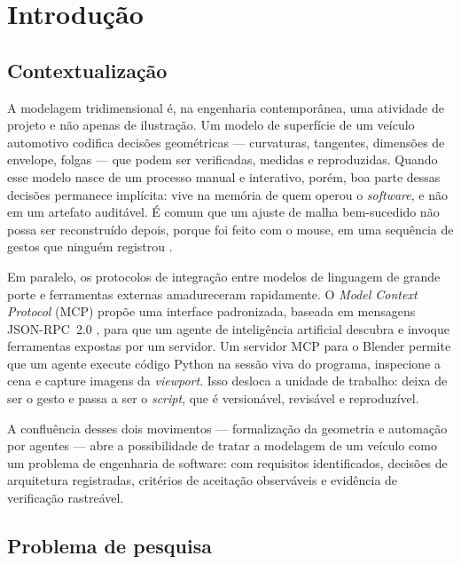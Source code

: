 \chapter{Introdu\c{c}\~ao}

\section{Contextualiza\c{c}\~ao}

A modelagem tridimensional \'e, na engenharia contempor\^anea, uma atividade de projeto e n\~ao
apenas de ilustra\c{c}\~ao. Um modelo de superf\'icie de um ve\'iculo automotivo codifica
decis\~oes geom\'etricas --- curvaturas, tangentes, dimens\~oes de envelope, folgas --- que podem
ser verificadas, medidas e reproduzidas. Quando esse modelo nasce de um processo manual e
interativo, por\'em, boa parte dessas decis\~oes permanece impl\'icita: vive na mem\'oria de
quem operou o \emph{software}, e n\~ao em um artefato audit\'avel. \'E comum que um ajuste de
malha bem-sucedido n\~ao possa ser reconstru\'ido depois, porque foi feito com o mouse, em uma
sequ\^encia de gestos que ningu\'em registrou \cite{bbotsch2010}.

Em paralelo, os protocolos de integra\c{c}\~ao entre modelos de linguagem de grande porte e
ferramentas externas amadureceram rapidamente. O \emph{Model Context Protocol} (MCP)
\cite{mcpspec2024} prop\~oe uma interface padronizada, baseada em mensagens JSON-RPC~2.0
\cite{jsonrpc2020}, para que um agente de intelig\^encia artificial descubra e invoque
ferramentas expostas por um servidor. Um servidor MCP para o Blender permite que um agente
execute c\'odigo Python na sess\~ao viva do programa, inspecione a cena e capture imagens da
\emph{viewport}. Isso desloca a unidade de trabalho: deixa de ser o gesto e passa a ser o
\emph{script}, que \'e version\'avel, revis\'avel e reproduz\'ivel.

A conflu\^encia desses dois movimentos --- formaliza\c{c}\~ao da geometria e automa\c{c}\~ao por
agentes --- abre a possibilidade de tratar a modelagem de um ve\'iculo como um problema de
engenharia de software: com requisitos identificados, decis\~oes de arquitetura registradas,
crit\'erios de aceita\c{c}\~ao observ\'aveis e evid\^encia de verifica\c{c}\~ao rastre\'avel.

\section{Problema de pesquisa}

